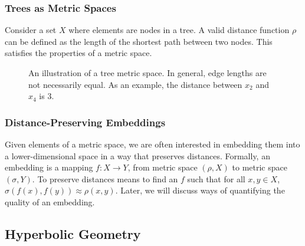 \documentclass{article}
\begin{document}
\subsubsection{Trees as Metric Spaces}

Consider a set $X$ where elements are nodes in a tree. A valid distance function $\rho$ can be defined as the length of the shortest path between two nodes. This satisfies the properties of a metric space.

\begin{figure}[ht]
  \centering
  \caption{An illustration of a tree metric space. In general, edge lengths are not necessarily equal. As an example, the distance between $x_2$ and $x_4$ is $3$.}
  \label{fig:tree-metric-space}
\end{figure}

\subsubsection{Distance-Preserving Embeddings}

Given elements of a metric space, we are often interested in embedding them into a lower-dimensional space in a way that preserves distances. Formally, an embedding is a mapping $f: X \rightarrow Y$, from metric space $(\rho, X)$ to metric space $(\sigma, Y)$. To preserve distances means to find an $f$ such that for all $x,y \in X$, $\sigma(f(x),f(y)) \approx \rho(x,y)$. Later, we will discuss ways of quantifying the quality of an embedding.

\subsection{Hyperbolic Geometry}
\end{document}
